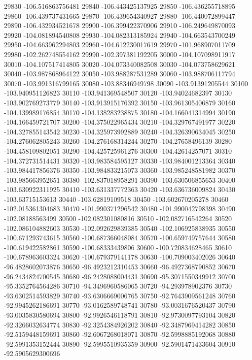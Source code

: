 {29830 -106.516863756481
29840 -106.443425137925
29850 -106.436255718895
29860 -106.439737431665
29870 -106.439654340927
29880 -106.440072899447
29890 -106.432934521678
29900 -106.399422370906
29910 -106.249649870093
29920 -104.081894540808
29930 -104.082313185924
29940 -104.663543700249
29950 -104.663962294803
29960 -104.612230017619
29970 -101.968907011709
29980 -102.262748554162
29990 -102.397381192205
30000 -104.107098911917
30010 -104.107517414805
30020 -104.073340082508
30030 -104.073758629621
30040 -103.987868964122
30050 -103.988287531289
30060 -103.988706117794
30070 -103.991316799165
30080 -103.88346949798
30090 -103.91391205544
30100 -103.940951126823
30110 -103.941369548507
30120 -103.94024682397
30130 -103.902769273779
30140 -103.913915176392
30150 -103.961305406879
30160 -104.139989176854
30170 -104.138283238875
30180 -104.166041314994
30190 -104.166459721707
30200 -104.375022965434
30210 -104.329767491977
30220 -104.327855143542
30230 -104.325973992889
30240 -104.326390634045
30250 -104.276062805243
30260 -104.276168314244
30270 -104.27658496139
30280 -104.458109802051
30290 -104.425725961276
30300 -104.42614257071
30310 -104.372731514431
30320 -103.983584595127
30330 -103.984001213364
30340 -103.984417856376
30350 -103.984833215073
30360 -103.985248581982
30370 -103.985663952651
30380 -102.837018958291
30390 -103.630506855653
30400 -103.630922311925
30410 -103.631337772363
30420 -103.636736009824
30430 -103.63715153613
30440 -103.62819109518
30450 -103.602670205278
30460 -102.015361304683
30470 -101.990371296542
30480 -101.990042798398
30490 -102.08188563499
30500 -102.082301080816
30510 -102.082716542264
30520 -102.086104882603
30530 -102.092629839385
30540 -102.106925838935
30550 -100.671293743615
30560 -100.687366048084
30570 -100.659749757644
30580 -100.619422582861
30590 -100.68333439806
30600 -100.720834628465
30610 -100.678963603324
30620 -100.679379141178
30630 -100.709003402026
30640 -96.4828602073876
30650 -96.4923212310453
30660 -96.4927368790852
30670 -96.2434824700545
30680 -96.2428088004431
30690 -95.3071550349912
30700 -95.3352764564286
30710 -94.3496960586065
30720 -94.293978902376
30730 -93.6302514593829
30740 -93.6306669006765
30750 -92.7643909561248
30760 -92.9945262186691
30770 -93.0162589748741
30780 -93.0031676520437
30790 -93.0035830580694
30800 -92.9926546118791
30810 -92.9730097793104
30820 -92.3266032634774
30830 -92.3254384926202
30840 -92.3487969414282
30850 -92.5159448159691
30860 -92.6067268018071
30870 -92.5998885192068
30880 -92.5991353152444
30890 -92.5995510935359
30900 -92.5901471433604
30910 -92.5905629300696
}
